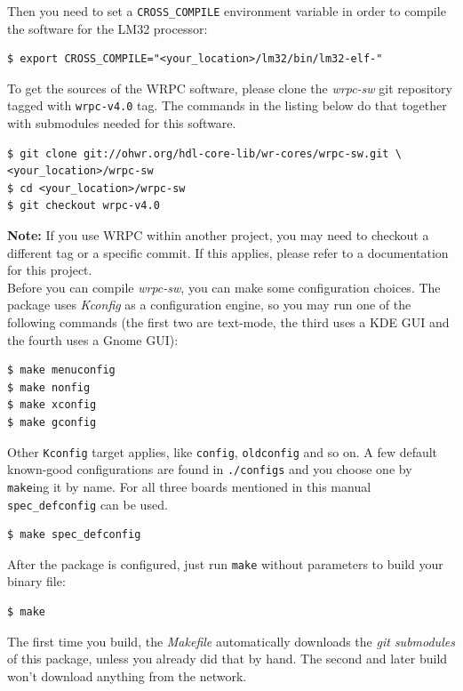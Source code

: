 \documentclass[a4paper, 12pt]{article}
\newcommand{\code}[1]{\texttt{#1}}
\begin{document}
Then you need to set a \texttt{CROSS\_COMPILE} environment variable in order
to compile the software for the LM32 processor:
\begin{lstlisting}
$ export CROSS_COMPILE="<your_location>/lm32/bin/lm32-elf-"
\end{lstlisting}

To get the sources of the WRPC software, please clone the \textit{wrpc-sw} git
repository tagged with \texttt{wrpc-v4.0} tag. The commands in the listing below
do that together with submodules needed for this software.\\
\begin{lstlisting}
$ git clone git://ohwr.org/hdl-core-lib/wr-cores/wrpc-sw.git \
<your_location>/wrpc-sw
$ cd <your_location>/wrpc-sw
$ git checkout wrpc-v4.0
\end{lstlisting}

\textbf{Note:} If you use WRPC within another project, you may need to checkout
a different tag or a specific commit. If this applies, please refer to a
documentation for this project.\\

Before you can compile \textit{wrpc-sw}, you can make some configuration
choices. The package uses \textit{Kconfig} as a configuration engine, so you may
run one of the following commands (the first two are text-mode, the third uses
a KDE GUI and the fourth uses a Gnome GUI):
\begin{lstlisting}
$ make menuconfig
$ make nonfig
$ make xconfig
$ make gconfig
\end{lstlisting}

Other \code{Kconfig} target applies, like \code{config}, \code{oldconfig}
and so on. A few default known-good configurations are found in
\texttt{./configs} and you choose one by \code{make}ing it by name. For all
three boards mentioned in this manual \code{spec\_defconfig} can be used.
\begin{lstlisting}
$ make spec_defconfig
\end{lstlisting}

After the package is configured, just run \code{make} without parameters to
build your binary file:
\begin{lstlisting}
$ make
\end{lstlisting}

The first time you build, the \textit{Makefile} automatically downloads
the \textit{git submodules} of this package, unless you already did that
by hand. The second and later build won't download anything
from the network.
\end{document}
